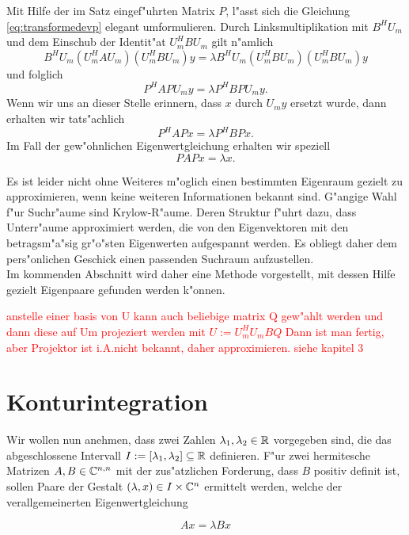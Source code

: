 Mit Hilfe der im Satz eingef"uhrten Matrix $P$, l"asst sich die Gleichung
\eqref{eq:transformedevp} elegant umformulieren. Durch Linksmultiplikation
mit $B^H U_m$ und dem Einschub der Identit"at $U_m^H B U_m$ gilt n"amlich
\[
B^H U_m (U_m^H A U_m)(U_m^H B U_m)y = \lambda B^H U_m (U_m^H B U_m)(U_m^H B U_m)y
\]
und folglich
\[
P^H A P U_m y = \lambda P^H B P U_m y.
\]
Wenn wir uns an dieser Stelle erinnern, dass $x$ durch $U_m y$ ersetzt wurde, dann
erhalten wir tats"achlich
\[
P^H A P x = \lambda P^H B P x.
\]
Im Fall der gew"ohnlichen Eigenwertgleichung erhalten wir speziell
\[
P A P x = \lambda x.
\]


Es ist leider nicht ohne Weiteres m"oglich einen bestimmten Eigenraum gezielt
zu approximieren, wenn keine weiteren Informationen bekannt sind. G"angige
Wahl f"ur Suchr"aume sind Krylow-R"aume. Deren Struktur f"uhrt dazu, dass
Unterr"aume approximiert werden, die von den Eigenvektoren mit den betragsm"a"sig
gr"o"sten Eigenwerten aufgespannt werden. Es obliegt daher dem pers"onlichen
Geschick einen passenden Suchraum aufzustellen.\\

Im kommenden Abschnitt wird daher eine Methode vorgestellt, mit dessen Hilfe gezielt
Eigenpaare gefunden werden k"onnen.

\textcolor{red}{anstelle einer basis von U kann auch beliebige matrix Q gew"ahlt
werden und dann diese auf Um projeziert werden mit $U:=U_m^H U_m B Q$ Dann
ist man fertig, aber Projektor ist i.A.nicht bekannt, daher approximieren. siehe
kapitel 3}

\section{Konturintegration}\label{sec:kontur}

Wir wollen nun anehmen, dass zwei Zahlen $\lambda_1, \lambda_2 \in \mathbb{R}$ vorgegeben sind, die
das abgeschlossene Intervall $I:=[\lambda_1, \lambda_2] \subseteq \mathbb{R}$ definieren.
F"ur zwei hermitesche Matrizen $A, B \in \mathbb{C}^{n,n}$ mit der zus"atzlichen
Forderung, dass $B$ positiv definit ist, sollen Paare der Gestalt
$(\lambda, x) \in I \times \mathbb{C}^n$ ermittelt werden, welche der verallgemeinerten
Eigenwertgleichung

  \begin{equation}\label{eq:eigen} %
  Ax = \lambda Bx
  \end{equation}

